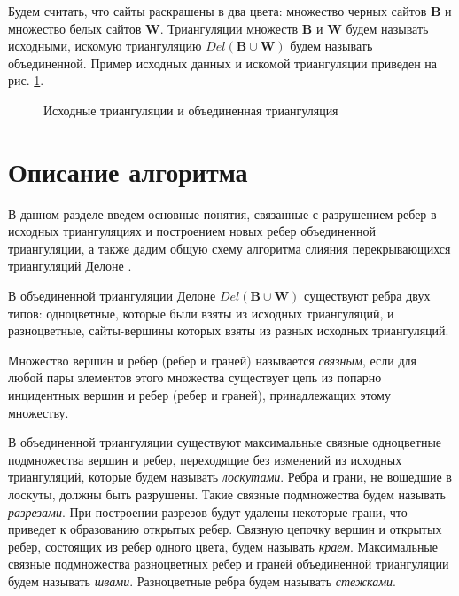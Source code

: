 \documentclass[12pt]{article}
\begin{document}
Будем считать, что сайты раскрашены в два цвета: множество черных сайтов $\textbf{B}$ и множество белых сайтов $\textbf{W}$.
Триангуляции множеств $\textbf{B}$ и $\textbf{W}$ будем называть исходными,
искомую триангуляцию $Del(\textbf{B} \cup \textbf{W})$ будем называть объединенной.
Пример исходных данных и искомой триангуляции приведен на рис. \ref{pic:model_data}.

\begin{figure}[htb!]
	\begin{minipage}[h]{0.49\linewidth}
	\end{minipage}
	\hfill
	\begin{minipage}[h]{0.49\linewidth}
	\end{minipage}
	\caption{Исходные триангуляции и объединенная триангуляция}
	\label{pic:model_data}
\end{figure}

\section{Описание алгоритма}
В данном разделе введем основные понятия, связанные с разрушением ребер в исходных триангуляциях
и построением новых ребер объединенной триангуляции,
а также дадим общую схему алгоритма слияния перекрывающихся триангуляций Делоне \cite{MestOverlap}.

В объединенной триангуляции Делоне $Del(\textbf{B} \cup \textbf{W})$ существуют ребра двух типов:
одноцветные, которые были взяты из исходных триангуляций, и разноцветные, сайты-вершины которых взяты из разных исходных триангуляций.

Множество вершин и ребер (ребер и граней) называется {\itshape связным}, если для любой пары элементов этого множества
существует цепь из попарно инцидентных вершин и ребер (ребер и граней), принадлежащих этому множеству.

В объединенной триангуляции существуют максимальные связные одноцветные подмножества вершин и ребер,
переходящие без изменений из исходных триангуляций, которые будем называть {\itshape лоскутами}.
Ребра и грани, не вошедшие в лоскуты, должны быть разрушены.
Такие связные подмножества будем называть {\itshape разрезами}.
При построении разрезов будут удалены некоторые грани, что приведет к образованию открытых ребер.
Связную цепочку вершин и открытых ребер, состоящих из ребер одного цвета, будем называть {\itshape краем}.
Максимальные связные подмножества разноцветных ребер и граней объединенной триангуляции будем называть {\itshape швами}.
Разноцветные ребра будем называть {\itshape стежками}.
\end{document}
